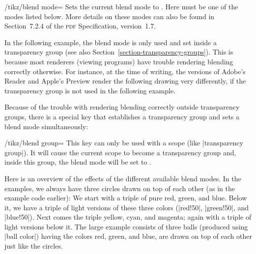 \begin{key}{/tikz/blend mode=}
    Sets the current blend mode to . Here  must be one of
    the modes listed below. More details on these modes can also be found in
    Section~7.2.4 of the \textsc{pdf} Specification, version~1.7.

    In the following example, the blend mode is only used and set inside a
    transparency group (see also Section~\ref{section-transparency-groups}).
    This is because most renderers (viewing programs) have trouble rendering
    blending correctly otherwise. For instance, at the time of writing, the
    versions of Adobe's Reader and Apple's Preview render the following drawing
    very differently, if the transparency group is not used in the following
    example.
\begin{codeexample}[]
\end{codeexample}

    Because of the trouble with rendering blending correctly outside
    transparency groups, there is a special key that establishes a transparency
    group and sets a blend mode simultaneously:

    \begin{key}{/tikz/blend group=}
        This key can only be used with a scope (like |transparency group|). It
        will cause the current scope to become a transparency group and, inside
        this group, the blend mode will be set to .
\begin{codeexample}[]
\end{codeexample}
    \end{key}

    Here is an overview of the effects of the different available blend modes.
    In the examples, we always have three circles drawn on top of each other
    (as in the example code earlier): We start with a triple of pure red,
    green, and blue. Below it, we have a triple of light versions of these
    three colors (|red!50|, |green!50|, and |blue!50|). Next comes the triple
    yellow, cyan, and magenta; again with a triple of light versions below it.
    The large example consists of three balls (produced using |ball color|)
    having the colors red, green, and blue, are drawn on top of each other just
    like the circles.


\end{key}
